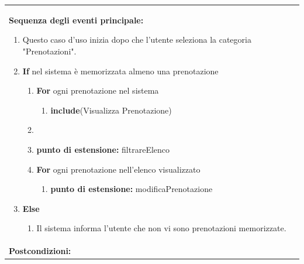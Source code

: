 \documentclass{article}
\begin{document}
\begin{table}[H]
\begin{tabular}{|p{\linewidth}|}
\begin{minipage}{\linewidth}
                        \end{minipage}
                        \vspace{0pt} \\
                        \hline
                        \textbf{Sequenza degli eventi principale:}
                        \begin{enumerate}
                            \item Questo caso d'uso inizia dopo che l'utente seleziona la categoria "Prenotazioni".
                            \item \textbf{If} nel sistema è memorizzata almeno una prenotazione
                            \begin{enumerate}
                                \item \textbf{For} ogni prenotazione nel sistema
                                \begin{enumerate}
                                    \item \textbf{include}(Visualizza Prenotazione)
                                \end{enumerate}
                                \item \item[] \textbf{punto di estensione:} filtrareElenco
                                \item \textbf{For} ogni prenotazione nell'elenco visualizzato
                                \begin{enumerate}
                                    \item[] \textbf{punto di estensione:} modificaPrenotazione %
                                \end{enumerate}
                            \end{enumerate}
                            \item \textbf{Else}
                            \begin{enumerate}
                                \item Il sistema informa l'utente che non vi sono prenotazioni memorizzate.
                            \end{enumerate}
                        \end{enumerate} \\
                        \hline
                        \cellcolor{gray!20}
                        \textbf{Postcondizioni:} \\

\end{tabular}
\end{table}
\end{document}
